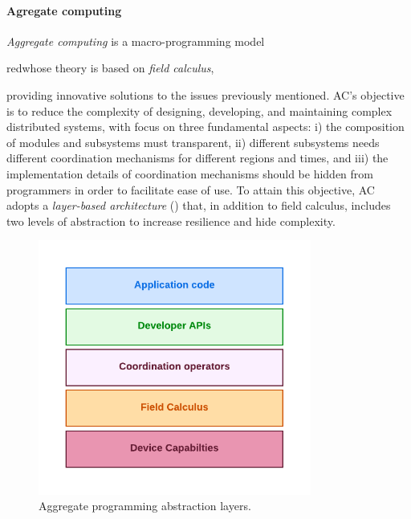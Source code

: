 \documentclass[12pt,a4paper,openright,twoside]{book}
\begin{document}
\paragraph{Agregate computing}
\emph{Aggregate computing} \cite{AC} is a macro-programming model \begin{color}{red}whose theory is based on \emph{field calculus}, \end{color}providing innovative solutions
    to the issues previously mentioned. AC's objective is to reduce the complexity of designing, developing, 
    and maintaining complex distributed systems, with focus on three fundamental aspects:
    i) the composition of modules and subsystems must transparent,
    ii) different subsystems needs different coordination mechanisms for different regions and times, and 
    iii) the implementation details of coordination mechanisms should be hidden from programmers in order to facilitate ease of use.
    To attain this objective, AC adopts a \emph{layer-based architecture} () that, in addition to field calculus, 
    includes two levels of abstraction to increase resilience and hide complexity. 


\begin{figure}[t]
    \centering
    \includegraphics[width=0.8\textwidth]{figures/AC-layers.pdf}
    \caption{Aggregate programming abstraction layers.}
    \label{fig:ac-layers}
\end{figure}
\end{document}
